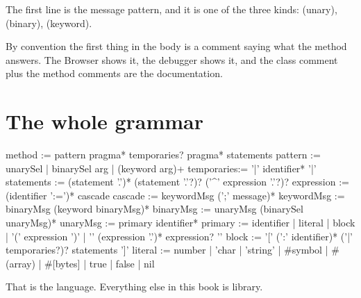 The first line is the message pattern, and it is one of the three kinds:
 (unary),  (binary),  (keyword).

By convention the first thing in the body is a comment saying what the method
answers. The Browser shows it, the debugger shows it, and the class comment
plus the method comments are the documentation.

\section{The whole grammar}

\begin{plain}
method     := pattern pragma* temporaries? pragma* statements
pattern    := unarySel | binarySel arg | (keyword arg)+
temporaries:= '|' identifier* '|'
statements := (statement '.')* (statement '.'?)? ('^' expression '.'?)?
expression := (identifier ':=')* cascade
cascade    := keywordMsg (';' message)*
keywordMsg := binaryMsg (keyword binaryMsg)*
binaryMsg  := unaryMsg (binarySel unaryMsg)*
unaryMsg   := primary identifier*
primary    := identifier | literal | block | '(' expression ')'
            | '{' (expression '.')* expression? '}'
block      := '[' (':' identifier)* ('|' temporaries?)? statements ']'
literal    := number | 'char | 'string' | #symbol | #(array)
            | #[bytes] | true | false | nil
\end{plain}

That is the language. Everything else in this book is library.

